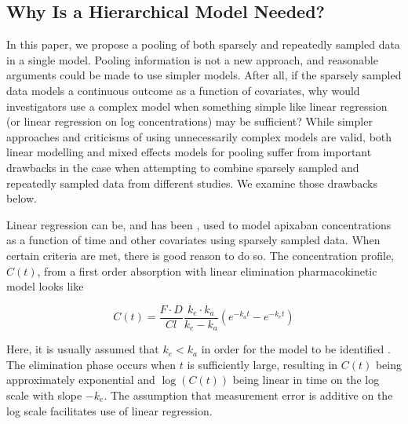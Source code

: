 \subsection{Why Is a Hierarchical Model Needed?}

In this paper, we propose a pooling of both sparsely and repeatedly sampled data in a single model. Pooling information is not a new approach, and reasonable arguments could be made to use simpler models.  After all, if the sparsely sampled data models a continuous outcome as a function of covariates, why would investigators use a complex model when something simple like linear regression (or linear regression on log concentrations) may be sufficient?  While simpler approaches and criticisms of using unnecessarily complex models are valid, both linear modelling and mixed effects models for pooling suffer from important drawbacks in the case when attempting to combine sparsely sampled and repeatedly sampled data from different studies.  We examine those drawbacks below.

Linear regression can be, and has been \cite{gulilat2020drug,vakkalagadda2016effect}, used to model apixaban concentrations as a function of time and other covariates using sparsely sampled data.  When certain criteria are met, there is good reason to do so.  The concentration profile, $C(t)$, from a first order absorption with linear elimination pharmacokinetic model looks like

$$ C(t) = \frac{F \cdot D}{C l} \frac{k_{e} \cdot k_{a}}{k_{e}-k_{a}}\left(e^{-k_{a}t}-e^{-k_{e}t}\right) $$

\noindent Here, it is usually assumed that $k_e<k_a$ in order for the model to be identified \cite{wakefield1996bayesian, salway2008gamma}. The elimination phase occurs when $t$ is sufficiently large, resulting in $C(t)$ being approximately exponential and $\log(C(t))$ being linear in time on the log scale with slope $-k_e$.  The assumption that measurement error is additive on the log scale facilitates use of linear regression.

